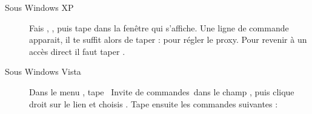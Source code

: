 \begin{description}

\item[Sous Windows XP] Fais , , puis
tape  dans la fenêtre qui s'affiche. Une ligne de commande apparait,
il te suffit alors de taper :  pour régler
le proxy. Pour revenir à un accès direct il faut taper .

\item[Sous Windows Vista]
Dans le menu , tape \guillemotleft~Invite de commandes~\guillemotright dans le champ , puis clique droit sur le lien
et choisis . Tape ensuite les commandes suivantes :



\end{description}
